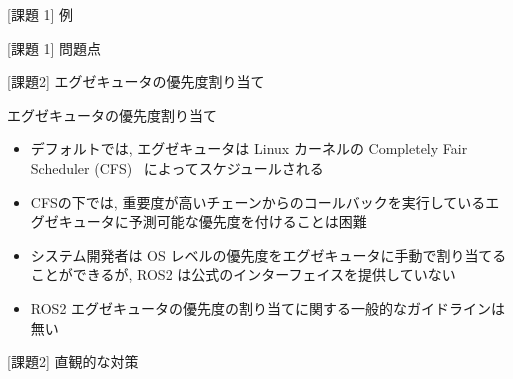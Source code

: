 \begin{frame}{[課題 1] 例}
\end{frame}

\begin{frame}{[課題 1] 問題点}
\end{frame}

\begin{frame}{[課題2] エグゼキュータの優先度割り当て}
    \begin{block}{エグゼキュータの優先度割り当て}
      \setlength{\linewidth}{0.98\columnwidth}
      \begin{itemize}
        \item デフォルトでは, エグゼキュータは Linux カーネルの Completely Fair Scheduler (CFS)~\cite{wong2008fairness} によってスケジュールされる
        \item CFSの下では, 重要度が高いチェーンからのコールバックを実行しているエグゼキュータに予測可能な優先度を付けることは困難
        \item システム開発者は OS レベルの優先度をエグゼキュータに手動で割り当てることができるが, ROS2 は公式のインターフェイスを提供していない
        \item ROS2 エグゼキュータの優先度の割り当てに関する一般的なガイドラインは無い
      \end{itemize}
    \end{block}
\end{frame}

\begin{frame}{[課題2] 直観的な対策}
\end{frame}

